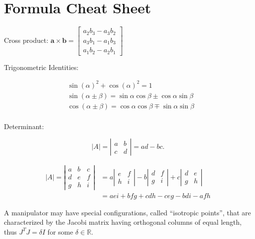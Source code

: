 \section{Formula Cheat Sheet}

\begin{minipage}[c]{0.4\textwidth}
Cross product:\quad
$\mathbf{a} \times \mathbf{b}=\left[\begin{array}{l}
a_{2} b_{3}-a_{3} b_{2} \\
a_{3} b_{1}-a_{1} b_{3} \\
a_{1} b_{2}-a_{2} b_{1}
\end{array}\right]$
\end{minipage}
\hfill
\begin{minipage}[c]{0.12\textwidth}
Trigonometric Identities:
\end{minipage}
\hfill
\begin{minipage}[c]{0.4\textwidth}
$$\begin{aligned}
&\sin(\alpha)^2 + \cos(\alpha)^2 = 1 \\
&\sin (\alpha\pm\beta)=\sin \alpha \cos \beta\pm\cos \alpha \sin \beta \\
&\cos (\alpha\pm\beta)=\cos \alpha \cos \beta\mp\sin \alpha \sin \beta \\
\end{aligned}$$
\end{minipage}
Determinant:

\begin{minipage}[c]{0.25\textwidth}
$$
|A|=\left|\begin{array}{ll}
a & b \\
c & d
\end{array}\right|=a d-b c .
$$
\end{minipage}
\hfill
\begin{minipage}[c]{0.7\textwidth}
$$
\begin{aligned}
|A|=\left|\begin{array}{lll}
a & b & c \\
d & e & f \\
g & h & i
\end{array}\right| &=a\left|\begin{array}{ll}
e & f \\
h & i
\end{array}\right|-b\left|\begin{array}{cc}
d & f \\
g & i
\end{array}\right|+c\left|\begin{array}{cc}
d & e \\
g & h
\end{array}\right| \\
&=a e i+b f g+c d h-c e g-b d i-a f h
\end{aligned}
$$
\end{minipage}
A manipulator may have special configurations, called ``isotropic points'', that are characterized by the Jacobi matrix having orthogonal columns of equal length, thus $J^{T} J=\delta I$ for some $\delta \in \mathbb{R}$.

